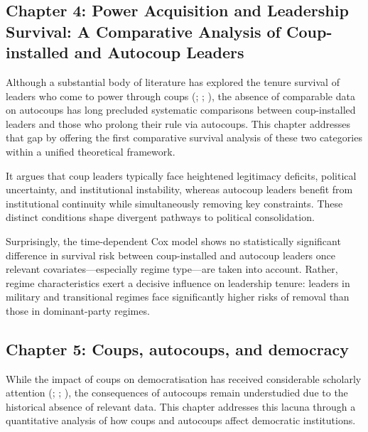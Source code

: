 \documentclass[
  12pt,
]{report}
\begin{document}
\subsection*{Chapter 4: Power Acquisition and Leadership Survival: A
Comparative Analysis of Coup-installed and Autocoup
Leaders}\label{chapter-4-power-acquisition-and-leadership-survival-a-comparative-analysis-of-coup-installed-and-autocoup-leaders}

Although a substantial body of literature has explored the tenure
survival of leaders who come to power through coups
(;
;
), the absence of
comparable data on autocoups has long precluded systematic comparisons
between coup-installed leaders and those who prolong their rule via
autocoups. This chapter addresses that gap by offering the first
comparative survival analysis of these two categories within a unified
theoretical framework.

It argues that coup leaders typically face heightened legitimacy
deficits, political uncertainty, and institutional instability, whereas
autocoup leaders benefit from institutional continuity while
simultaneously removing key constraints. These distinct conditions shape
divergent pathways to political consolidation.

Surprisingly, the time-dependent Cox model shows no statistically
significant difference in survival risk between coup-installed and
autocoup leaders once relevant covariates---especially regime type---are
taken into account. Rather, regime characteristics exert a decisive
influence on leadership tenure: leaders in military and transitional
regimes face significantly higher risks of removal than those in
dominant-party regimes.

\subsection*{Chapter 5: Coups, autocoups, and
democracy}\label{chapter-5-coups-autocoups-and-democracy}

While the impact of coups on democratisation has received considerable
scholarly attention (; ;
), the consequences of
autocoups remain understudied due to the historical absence of relevant
data. This chapter addresses this lacuna through a quantitative analysis
of how coups and autocoups affect democratic institutions.
\end{document}
